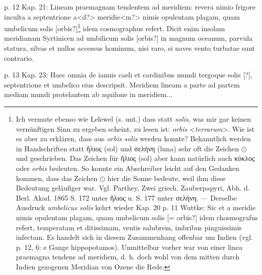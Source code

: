 \documentclass[a4paper, 11pt, oneside]{article}
\begin{document}
p. 12 Kap. 21: Lineam praemagnam tendentem ad meridiem: revera nimio frigore inculta a septentrione a<d?> meridie<m?> nimis opulentam plagam, quam umbelicum solis [orbis?]\footnote{Ich vermute ebenso wie Lelewel (s. unt.) dass statt \emph{solis}, was mir gar keinen vernünftigen Sinn zu ergeben scheint, zu lesen ist: \emph{orbis} <\emph{terrarum}>. Wie ist es aber zu erklären, dass aus \emph{orbis solis} werden konnte? Bekanntlich werden in Handschriften statt ἥλιος (sol) und σελήνη (luna) sehr oft die Zeichen $\odot$ und \leftmoon geschrieben. Das Zeichen für ἥλιος (sol) aber kann natürlich auch κύκλος oder \emph{orbis} bedeuten. So konnte ein Abschreiber leicht auf den Gedanken kommen, dass das Zeichen $\odot$ hier die Sonne bedeute, weil ihm diese Bedeutung geläufiger war. Vgl. Parthey, Zwei griech. Zauberpapyri, Abh. d. Berl. Akad. 1865 S. 172 unter ἥλιος u. S. 177 unter σελήνη. --- Derselbe Ausdruck \emph{umbelicus solis} kehrt wieder Kap. 20 p. 11 Wuttke: Sic et a meridie nimis opulentam plagam, quam umbelicum solis [= orbis?] idem chosmografus refert, temperatam et ditissimam, ventis salubrem, imbribus pinguissimis infectam. Es handelt sich in diesem Zusammenhang offenbar um Indien (vgl. p. 12, 6: e Gange hippopotamos). Unmittelbar vorher war von einer linea praemagna tendens ad meridiem, d. h. doch wohl von dem mitten durch Indien gezogenen Meridian von Ozene die Rede.} idem cosmographus refert. Dicit enim insolam meridianam Syrtinicen ad umbilicum solis [orbis?] in magnum oceanum, parvula statura, silvas et nullos accessus hominum, nisi raro, si naves vento turbatae sunt contrario.

p. 13 Kap. 23: Haec omnia de ianuis caeli et cardinibus mundi tergoque solis [?], septentrione et umbelico eius descripsit. Meridiem lineam a parte ad partem mediam mundi protelantem ab aquilone in meridiem...
\end{document}

